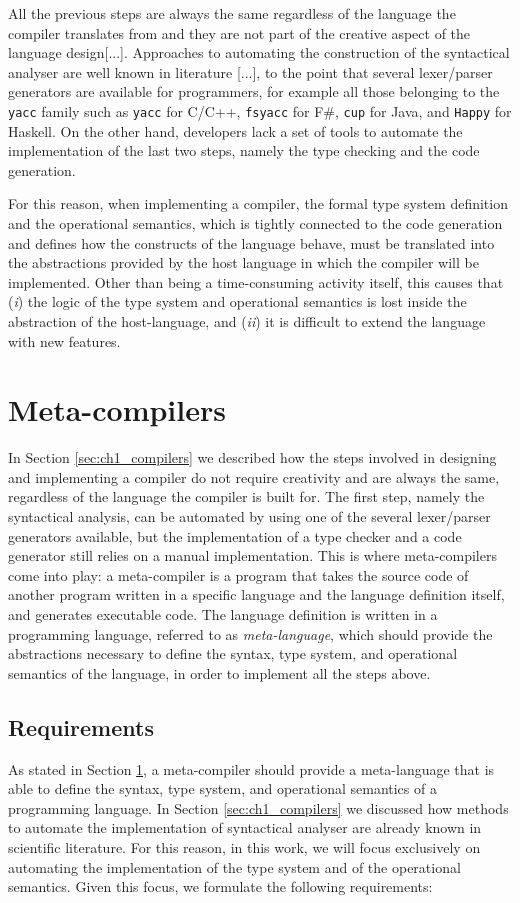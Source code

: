 All the previous steps are always the same regardless of the language the compiler translates from and they are not part of the creative aspect of the language design[...]. Approaches to automating the construction of the syntactical analyser are well known in literature [...], to the point that several lexer/parser generators are available for programmers, for example all those belonging to the \texttt{yacc} family such as \texttt{yacc} for C/C++, \texttt{fsyacc} for F\#, \texttt{cup} for Java, and \texttt{Happy} for Haskell. On the other hand, developers lack a set of tools to automate the implementation of the last two steps, namely the type checking and the code generation.

For this reason, when implementing a compiler, the formal type system definition and the operational semantics, which is tightly connected to the code generation and defines how the constructs of the language behave, must be translated into the abstractions provided by the host language in which the compiler will be implemented. Other than being a time-consuming activity itself, this causes that (\textit{i}) the logic of the type system and operational semantics is lost inside the abstraction of the host-language, and (\textit{ii}) it is difficult to extend the language with new features.

\section{Meta-compilers}
\label{sec:ch1_metacompilers}
In Section \ref{sec:ch1_compilers} we described how the steps involved in designing and implementing a compiler do not require creativity and are always the same, regardless of the language the compiler is built for. The first step, namely the syntactical analysis, can be automated by using one of the several lexer/parser generators available, but the implementation of a type checker and a code generator still relies on a manual implementation. This is where meta-compilers come into play: a meta-compiler is a program that takes the source code of another program written in a specific language and the language definition itself, and generates executable code. The language definition is written in a programming language, referred to as \textit{meta-language}, which should provide the abstractions necessary to define the syntax, type system, and operational semantics of the language, in order to implement all the steps above.

\subsection{Requirements}
As stated in Section \ref{sec:ch1_metacompilers}, a meta-compiler should provide a meta-language that is able to define the syntax, type system, and operational semantics of a programming language. In Section \ref{sec:ch1_compilers} we discussed how methods to automate the implementation of syntactical analyser are already known in scientific literature. For this reason, in this work, we will focus exclusively on automating the implementation of the type system and of the operational semantics. Given this focus, we formulate the following requirements:

